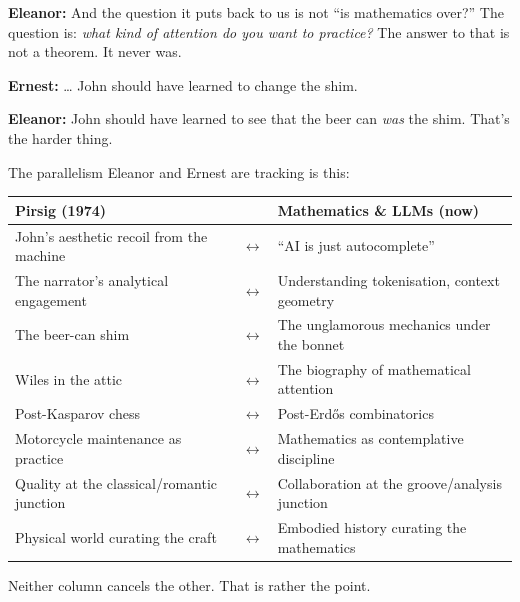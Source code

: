 \noindent\textbf{Eleanor:} And the question it puts back to us is not ``is mathematics over?''
The question is: \textit{what kind of attention do you want to practice?}
The answer to that is not a theorem. It never was.
 
\noindent\textbf{Ernest:} \ldots{} John should have learned to change the shim.
 
\noindent\textbf{Eleanor:} John should have learned to see that the beer can \textit{was} the shim.
That's the harder thing.
 
\vspace{1em}
 
\noindent The parallelism Eleanor and Ernest are tracking is this:
 
\begin{center}
\renewcommand{\arraystretch}{1.5}
\begin{tabular}{p{5.5cm} p{0.5cm} p{5.5cm}}
\textbf{Pirsig (1974)} & & \textbf{Mathematics \& LLMs (now)} \\
\hline
John's aesthetic recoil from the machine & $\leftrightarrow$ & ``AI is just autocomplete'' \\
The narrator's analytical engagement & $\leftrightarrow$ & Understanding tokenisation, context geometry \\
The beer-can shim & $\leftrightarrow$ & The unglamorous mechanics under the bonnet \\
Wiles in the attic & $\leftrightarrow$ & The biography of mathematical attention \\
Post-Kasparov chess & $\leftrightarrow$ & Post-Erd\H{o}s combinatorics \\
Motorcycle maintenance as practice & $\leftrightarrow$ & Mathematics as contemplative discipline \\
Quality at the classical/romantic junction & $\leftrightarrow$ & Collaboration at the groove/analysis junction \\
Physical world curating the craft & $\leftrightarrow$ & Embodied history curating the mathematics \\
\hline
\end{tabular}
\end{center}
 
\medskip
\noindent Neither column cancels the other. That is rather the point.
 









 








